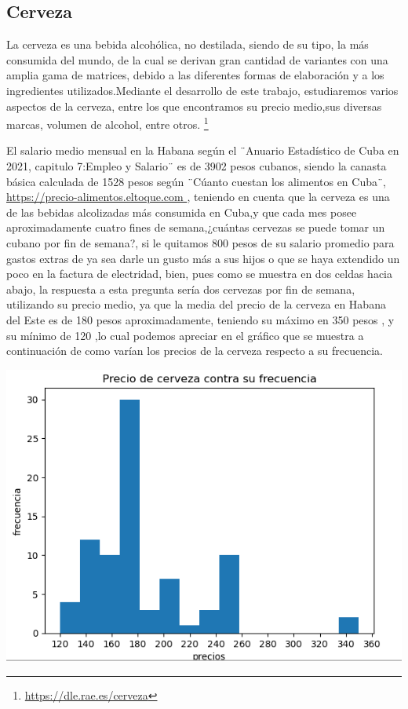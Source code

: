 \documentclass[a4paper,11pt]{article}
\begin{document}
\subsection{Cerveza}
La cerveza es una bebida alcohólica, no destilada, siendo de su tipo, la más consumida del mundo, de la cual se derivan gran cantidad de variantes con una amplia gama de matrices, debido a las diferentes formas de elaboración y a los ingredientes utilizados.Mediante el desarrollo de este trabajo, estudiaremos varios aspectos de la cerveza, entre los que encontramos su precio medio,sus diversas marcas, volumen de alcohol, entre otros.
\footnote{\href{https://dle.rae.es/cerveza}{https://dle.rae.es/cerveza}}
\par\vspace{2pt}
El salario medio mensual en la Habana según el  ¨Anuario Estadístico de Cuba en 2021, capitulo 7:Empleo y Salario¨ es de 3902 pesos cubanos, siendo la canasta básica calculada de 1528 pesos según ¨Cúanto cuestan los alimentos en Cuba¨,
\url{https://precio-alimentos.eltoque.com }
, teniendo en cuenta que la cerveza es una de las bebidas alcolizadas más consumida en Cuba,y que cada mes posee aproximadamente cuatro fines de semana,¿cuántas cervezas se puede tomar un cubano por fin de semana?, si le quitamos 800 pesos de su salario promedio para gastos extras de ya sea darle un gusto más a sus hijos o que se haya extendido un  poco en la factura de electridad, bien, pues como se muestra en dos celdas hacia abajo, la respuesta a esta pregunta sería dos cervezas por fin de semana, utilizando su precio medio, ya que la media del precio de la cerveza en Habana del Este es de 180 pesos aproximadamente, teniendo su máximo en 350 pesos , y su mínimo de 120 ,lo cual podemos apreciar en el gráfico que se muestra a continuación de como varían los precios de la cerveza respecto a su frecuencia.
\par\vspace{2pt}
\begin{minipage}{0.5\textwidth}
  \begin{center}
      \includegraphics[width=1.3\textwidth]{precio cerveza.png}
  \end{center}
\end{minipage}
\end{document}
